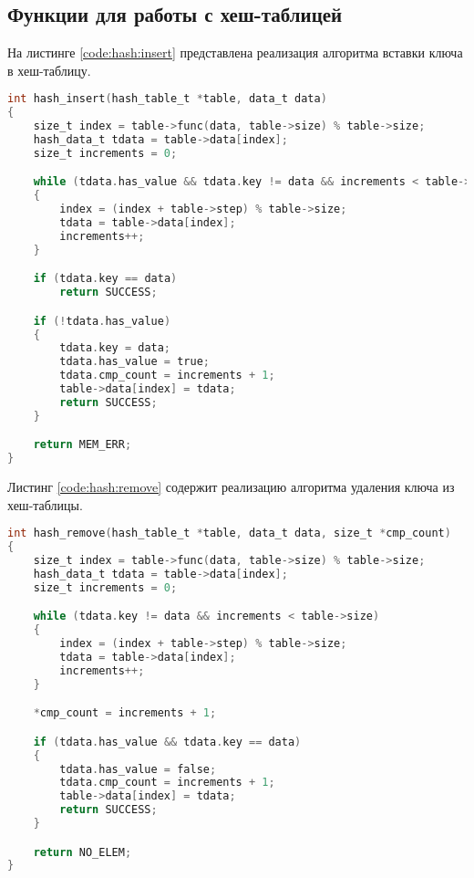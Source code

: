 \clearpage

\subsection{Функции для работы с хеш-таблицей}

На листинге \ref{code:hash:insert} представлена реализация алгоритма вставки ключа в хеш-таблицу.

\begin{lstlisting}[language=C,caption=Реализация алгоритма вставки ключа в хеш-таблицу,label=code:hash:insert]
int hash_insert(hash_table_t *table, data_t data)
{
    size_t index = table->func(data, table->size) % table->size;
    hash_data_t tdata = table->data[index];
    size_t increments = 0;

    while (tdata.has_value && tdata.key != data && increments < table->size)
    {
        index = (index + table->step) % table->size;
        tdata = table->data[index];
        increments++;
    }

    if (tdata.key == data)
        return SUCCESS;

    if (!tdata.has_value)
    {
        tdata.key = data;
        tdata.has_value = true;
        tdata.cmp_count = increments + 1;
        table->data[index] = tdata;
        return SUCCESS;
    }

    return MEM_ERR;
}
\end{lstlisting}

\clearpage

Листинг \ref{code:hash:remove} содержит реализацию алгоритма удаления ключа из хеш-таблицы.

\begin{lstlisting}[language=C,caption=Реализация алгоритма удаления ключа из хеш-табллицы,label=code:hash:remove]
int hash_remove(hash_table_t *table, data_t data, size_t *cmp_count)
{
    size_t index = table->func(data, table->size) % table->size;
    hash_data_t tdata = table->data[index];
    size_t increments = 0;

    while (tdata.key != data && increments < table->size)
    {
        index = (index + table->step) % table->size;
        tdata = table->data[index];
        increments++;
    }

    *cmp_count = increments + 1;

    if (tdata.has_value && tdata.key == data)
    {
        tdata.has_value = false;
        tdata.cmp_count = increments + 1;
        table->data[index] = tdata;
        return SUCCESS;
    }

    return NO_ELEM;
}
\end{lstlisting}

